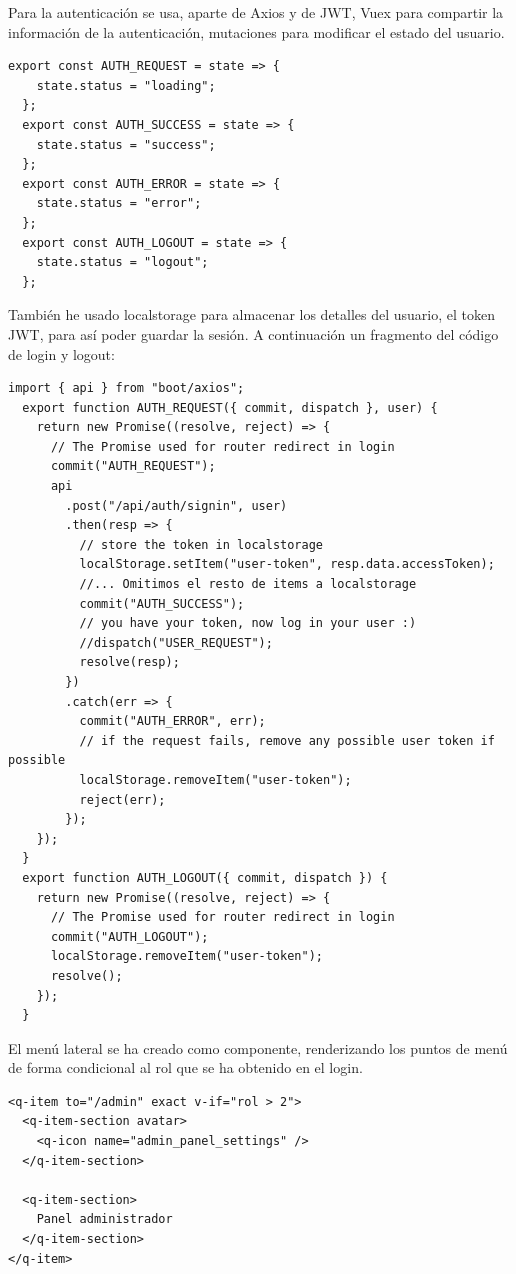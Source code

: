 \documentclass[11pt,spanish,listoffigures,listoftables]{tfgetsinf}
\begin{document}
Para la autenticación se usa, aparte de Axios y de JWT, Vuex para compartir la información de la autenticación, mutaciones para modificar el estado del usuario. 
\begin{lstlisting}[style=ES6, caption={Estados Vuex autenticación}]
  export const AUTH_REQUEST = state => {
    state.status = "loading";
  };
  export const AUTH_SUCCESS = state => {
    state.status = "success";
  };
  export const AUTH_ERROR = state => {
    state.status = "error";
  };
  export const AUTH_LOGOUT = state => {
    state.status = "logout";
  };
\end{lstlisting}


También he usado localstorage para almacenar los detalles del usuario, el token JWT, para así poder guardar la sesión. A continuación un fragmento del código de login y logout:

\begin{lstlisting}[style=ES6, caption={Dispatch de una acción Vuex en el login}]
  import { api } from "boot/axios";
  export function AUTH_REQUEST({ commit, dispatch }, user) {
    return new Promise((resolve, reject) => {
      // The Promise used for router redirect in login
      commit("AUTH_REQUEST");
      api
        .post("/api/auth/signin", user)
        .then(resp => {
          // store the token in localstorage
          localStorage.setItem("user-token", resp.data.accessToken); 
          //... Omitimos el resto de items a localstorage
          commit("AUTH_SUCCESS");
          // you have your token, now log in your user :)
          //dispatch("USER_REQUEST");
          resolve(resp);
        })
        .catch(err => {
          commit("AUTH_ERROR", err);
          // if the request fails, remove any possible user token if possible
          localStorage.removeItem("user-token"); 
          reject(err);
        });
    });
  }  
  export function AUTH_LOGOUT({ commit, dispatch }) {
    return new Promise((resolve, reject) => {
      // The Promise used for router redirect in login
      commit("AUTH_LOGOUT");
      localStorage.removeItem("user-token");
      resolve();
    });
  }
\end{lstlisting}

El menú lateral se ha creado como componente, renderizando los puntos de menú de forma condicional al rol que se ha obtenido en el login.

\begin{lstlisting}[style=ES6, caption={Renderización condicional de punto de menú Admin}]
  <q-item to="/admin" exact v-if="rol > 2">
  <q-item-section avatar>
    <q-icon name="admin_panel_settings" />
  </q-item-section>

  <q-item-section>
    Panel administrador
  </q-item-section>
</q-item>
\end{lstlisting}
\end{document}
